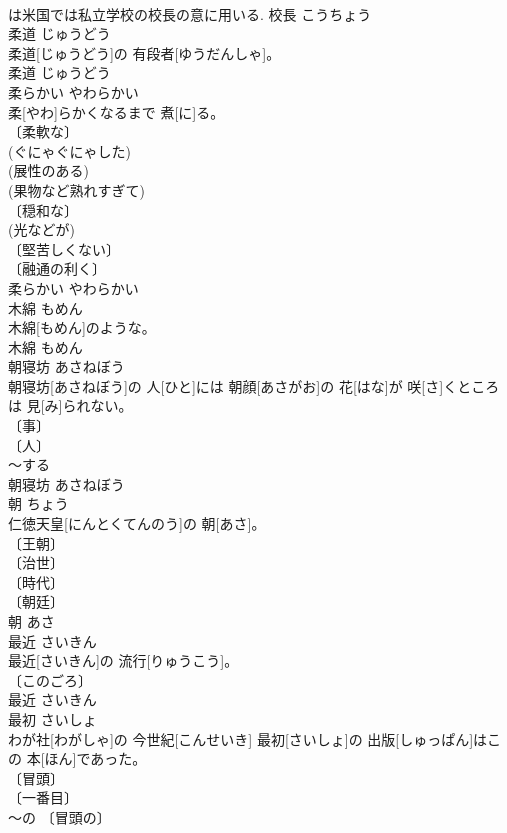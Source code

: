 \documentclass[8pt]{extreport}
\begin{document}
\begin{CJK}{UTF8}{min}
\\	は米国では私立学校の校長の意に用いる.	校長	こうちょう	
\\	柔道	じゅうどう	
\\	柔道[じゅうどう]の 有段者[ゆうだんしゃ]。	
\\	[⇒柔道の技]	柔道	じゅうどう	
\\	柔らかい	やわらかい	
\\	柔[やわ]らかくなるまで 煮[に]る。	
\\	〔柔軟な〕 
\\	(ぐにゃぐにゃした) 
\\	(展性のある) 
\\	(果物など熟れすぎて) 
\\	〔穏和な〕 
\\	(光などが) 
\\	〔堅苦しくない〕 
\\	〔融通の利く〕 
\\	柔らかい	やわらかい	
\\	木綿	もめん	
\\	木綿[もめん]のような。	
\\	木綿	もめん	
\\	朝寝坊	あさねぼう	
\\	朝寝坊[あさねぼう]の 人[ひと]には 朝顔[あさがお]の 花[はな]が 咲[さ]くところは 見[み]られない。	
\\	〔事〕 
\\	〔人〕 
\\	～する 
\\	朝寝坊	あさねぼう	
\\	朝	ちょう	
\\	仁徳天皇[にんとくてんのう]の 朝[あさ]。	
\\	〔王朝〕 
\\	〔治世〕 
\\	〔時代〕 
\\	〔朝廷〕 
\\	朝	あさ	
\\	最近	さいきん	
\\	最近[さいきん]の 流行[りゅうこう]。	
\\	〔このごろ〕 
\\	最近	さいきん	
\\	最初	さいしょ	
\\	わが社[わがしゃ]の 今世紀[こんせいき] 最初[さいしょ]の 出版[しゅっぱん]はこの 本[ほん]であった。	
\\	〔冒頭〕 
\\	〔一番目〕 
\\	～の 〔冒頭の〕 

\end{CJK}
\end{document}
